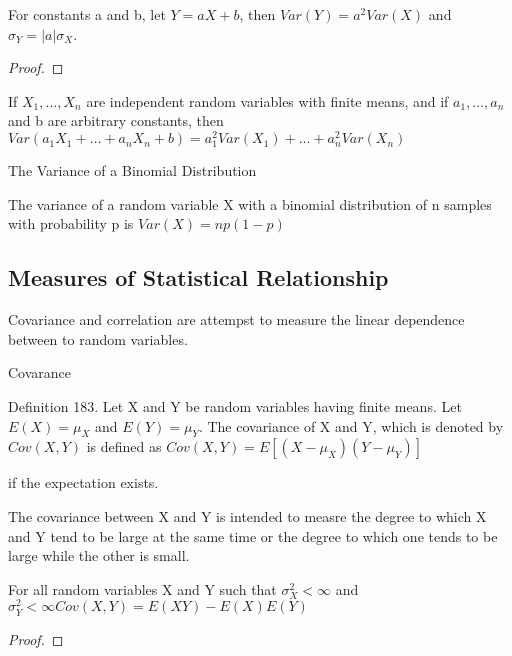 \begin{proposition}
For constants a and b, let $Y=aX+b$, then $Var\left(Y\right)=a^{2}Var\left(X\right)$
and $\sigma_{Y}=\left|a\right|\sigma_{X}$.
\end{proposition}
\begin{proof}
\end{proof}

{\color{red} If $X_{\text{1}},\ldots,X_{n}$ are independent random variables with finite means, and if $a_{1},\ldots,a_{n}$ and b are arbitrary constants, then $Var\left(a_{1}X_{1}+\ldots+a_{n}X_{n}+b\right)=a_{1}^{2}Var\left(X_{1}\right)+\ldots+a_{n}^{2}Var\left(X_{n}\right)$}

\begin{example}
The Variance of a Binomial Distribution

The variance of a random variable X with a binomial distribution of n samples with probability p is $Var\left(X\right)=np\left(1-p\right)$
\end{example}


\subsection{Measures of Statistical Relationship}



Covariance and correlation are attempst to measure the linear dependence between to random variables.

Covarance

\begin{definition}
Definition 183. Let X and Y be random variables having finite means. Let $E\left(X\right)=\mu_{X}$ and $E\left(Y\right)=\mu_{Y}$. The covariance of X and Y, which is denoted by $Cov\left(X,Y\right)$ is defined as $Cov\left(X,Y\right)=E\left[\left(X-\mu_{X}\right)\left(Y-\mu_{Y}\right)\right]$
\end{definition}

if the expectation exists.

The covariance between X and Y is intended to measre the degree to which X and Y tend to be large at the same time or the degree to which one tends to be large while the other is small.

\begin{proposition}
For all random variables X and Y such that $\sigma_{X}^{2}<\infty$ and $\sigma_{Y}^{2}<\infty Cov\left(X,Y\right)=E\left(XY\right)-E\left(X\right)E\left(Y\right)$
\end{proposition}
\begin{proof}
\end{proof}

